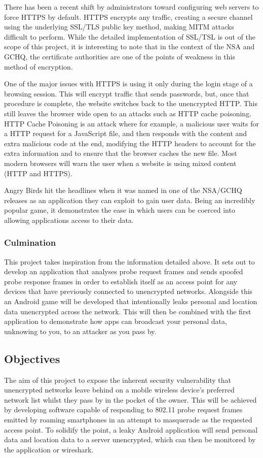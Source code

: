 There has been a recent shift by administrators toward configuring web servers to force HTTPS by default. HTTPS encrypts any traffic, creating a secure channel using the underlying SSL/TLS public key method, making MITM attacks difficult to perform. While the detailed implementation of SSL/TSL is out of the scope of this project, it is interesting to note that in the context of the NSA and GCHQ, the certificate authorities are one of the points of weakness in this method of encryption. 

One of the major issues with HTTPS is using it only during the login stage of a browsing session. This will encrypt traffic that sends passwords, but, once that procedure is complete, the website switches back to the unencrypted HTTP. This still leaves the browser wide open to an attacks such as HTTP cache poisoning. HTTP Cache Poisoning is an attack where for example, a malicious user waits for a HTTP request for a JavaScript file, and then responds with the content and extra malicious code at the end, modifying the HTTP headers to account for the extra information and to ensure that the browser caches the new file. Most modern browsers will warn the user when a website is using mixed content (HTTP and HTTPS).

Angry Birds hit the headlines when it was named in one of the NSA/GCHQ releases \cite{intro:angry_leak} as an application they can exploit to gain user data. Being an incredibly popular game, it demonstrates the ease in which users can be coerced into allowing applications access to their data.

\subsubsection{Culmination}

This project takes inspiration from the information detailed above. It sets out to develop an application that analyses probe request frames and sends spoofed probe response frames in order to establish itself as an access point for any devices that have previously connected to unencrypted networks. Alongside this an Android game will be developed that intentionally leaks personal and location data unencrypted across the network. This will then be combined with the first application to demonstrate how apps can broadcast your personal data, unknowing to you, to an attacker as you pass by.

\subsection{Objectives}
The aim of this project to expose the inherent security vulnerability that unencrypted networks leave behind on a mobile wireless device's preferred network list whilst they pass by in the pocket of the owner. This will be achieved by developing software capable of responding to 802.11 probe request frames emitted by roaming smartphones in an attempt to masquerade as the requested access point. To solidify the point, a leaky Android application will send personal data and location data to a server unencrypted, which can then be monitored by the application or wireshark.

